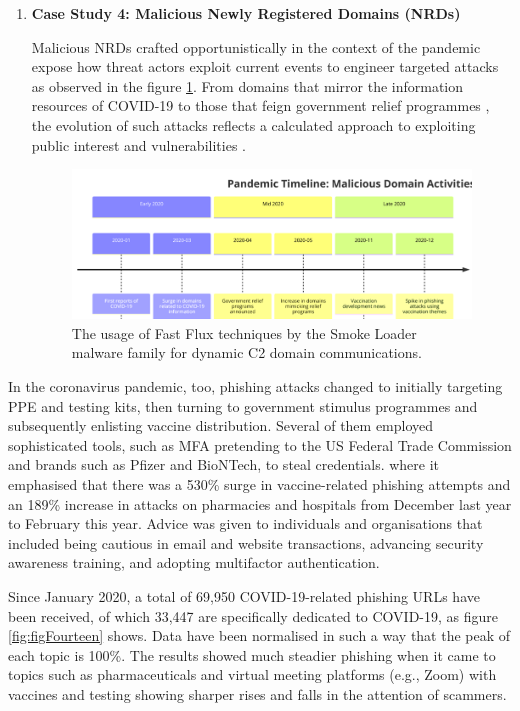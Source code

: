 \begin{enumerate}
\item\textbf{Case Study 4:  Malicious Newly Registered Domains (NRDs)}

Malicious NRDs crafted opportunistically in the context of the pandemic expose how threat actors exploit current events to engineer targeted attacks as observed in the figure \ref{fig:figThirteen}. From domains that mirror the information resources of COVID-19 to those that feign government relief programmes \cite{paloaltonetworks2021dnsattacks}, the evolution of such attacks reflects a calculated approach to exploiting public interest and vulnerabilities  \cite{unit42_covid19_phishing_2021} .

\captionsetup{font= footnotesize}
\begin{figure}[H]
    \centering
    \includegraphics[width=0.6\linewidth]{background/PandemicTime.png}
    \caption{The usage of Fast Flux techniques by the Smoke Loader malware family for dynamic C2 domain communications.}
    \label{fig:figThirteen}
\end{figure}

\end{enumerate}

In the coronavirus pandemic, too, phishing attacks changed to initially targeting PPE and testing kits, then turning to government stimulus programmes and subsequently enlisting vaccine distribution. Several of them employed sophisticated tools, such as MFA pretending to the US Federal Trade Commission and brands such as Pfizer and BioNTech, to steal credentials. where it emphasised that there was a 530\% surge in vaccine-related phishing attempts and an 189\% increase in attacks on pharmacies and hospitals from December last year to February this year. Advice was given to individuals and organisations that included being cautious in email and website transactions, advancing security awareness training, and adopting multifactor authentication.

Since January 2020, a total of 69,950 COVID-19-related phishing URLs have been received, of which 33,447 are specifically dedicated to COVID-19, as figure \ref{fig:figFourteen} shows. Data have been normalised in such a way that the peak of each topic is 100\%. The results showed much steadier phishing when it came to topics such as pharmaceuticals and virtual meeting platforms (e.g., Zoom) with vaccines and testing showing sharper rises and falls in the attention of scammers.

